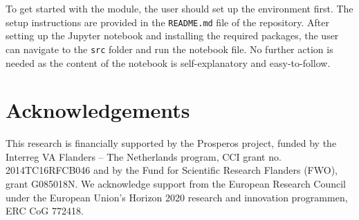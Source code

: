 To get started with the module, the user should set up the environment first. The setup instructions are provided in the \texttt{README.md} file of the repository. After setting up the Jupyter notebook and installing the required packages, the user can navigate to the \texttt{src} folder and run the notebook file. No further action is needed as the content of the notebook is self-explanatory and easy-to-follow.

\section{Acknowledgements}

This research is financially supported by the Prosperos project, funded by the Interreg VA Flanders – The Netherlands program, CCI grant no. 2014TC16RFCB046 and by the Fund for Scientific Research Flanders (FWO), grant G085018N. We acknowledge support from the European Research Council under the European Union's Horizon 2020 research and innovation programmen, ERC CoG 772418.


